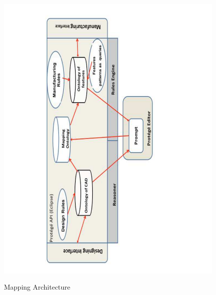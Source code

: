 \begin{figure}
	\centering
	\scriptsize
	\begin{minipage}{.5\textwidth}
		\includegraphics[scale=0.35, angle=-90]{figure-chapterIV/fig4-34}\\
		\caption{Mapping Architecture}
		\label{figure4-34}
	\end{minipage}%
	\begin{minipage}{.5\textwidth}

\end{minipage}
\end{figure}
